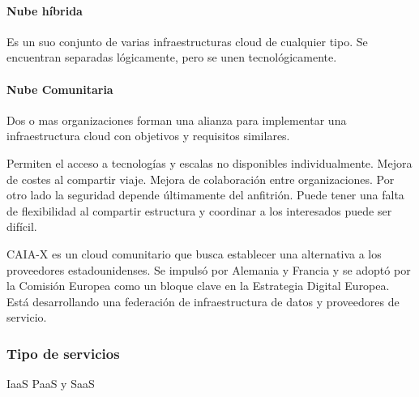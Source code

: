     \paragraph{Nube híbrida}
        Es un suo conjunto de varias infraestructuras cloud de cualquier tipo. Se encuentran separadas lógicamente, pero se unen tecnológicamente.

    \paragraph{Nube Comunitaria}
        Dos o mas organizaciones forman una alianza para implementar una infraestructura cloud con objetivos y requisitos similares.

        Permiten el acceso a tecnologías y escalas no disponibles individualmente. Mejora de costes al compartir viaje. Mejora de colaboración entre organizaciones. Por otro lado la seguridad depende últimamente del anfitrión. Puede tener una falta de flexibilidad al compartir estructura y coordinar a los interesados puede ser difícil.

        CAIA-X es un cloud comunitario que busca establecer una alternativa a los proveedores estadounidenses. Se impulsó por Alemania y Francia y se adoptó por la Comisión Europea como un bloque clave en la Estrategia Digital Europea. Está desarrollando una federación de infraestructura de datos y proveedores de servicio.

    \subsubsection{Tipo de servicios}
        IaaS PaaS y SaaS

